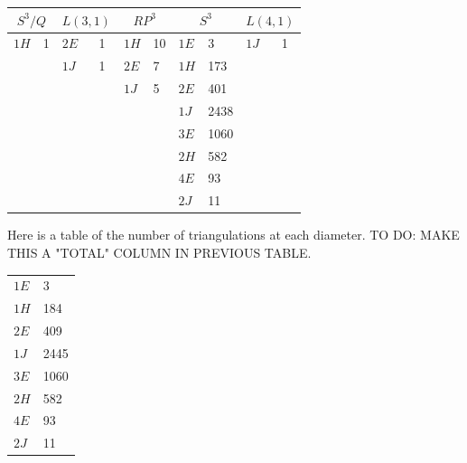 \documentclass[12pt]{article}
\begin{document}
\begin{tabular} {| l l | l l | l l | l l | l l |}
\hline
\multicolumn{2}{|c|}{$S^{3}/Q$} &
\multicolumn{2}{|c|}{$L(3,1)$} &
\multicolumn{2}{|c|}{$RP^{3}$} &
\multicolumn{2}{|c|}{$S^{3}$} &
\multicolumn{2}{|c|}{$L(4,1)$} \\
\hline
\hline
$1H$&1    &$2E$&1    &$1H$&10    &$1E$&3    &$1J$&1 \\
  &       &$1J$&1    &$2E$&7     &$1H$&173  &    &  \\
  &       &  &       &$1J$&5     &$2E$&401  &    &  \\
  &       &  &       &    &      &$1J$&2438 &    &  \\
  &       &  &       &    &      &$3E$&1060 &    &  \\
  &       &  &       &    &      &$2H$&582  &    &  \\
  &       &  &       &    &      &$4E$&93   &    &  \\
  &       &  &       &    &      &$2J$&11   &    &  \\
\hline
\end{tabular}

\noindent Here is a table of the number of triangulations at each diameter. TO DO: MAKE THIS A "TOTAL" COLUMN IN PREVIOUS TABLE.\vspace{.1in}

\begin{tabular} {| l l |}
\hline
$1E$ &       3\\
$1H$ &       184\\
$2E$ &       409\\
$1J$ &       2445\\
$3E$ &       1060\\
$2H$ &       582\\
$4E$ &       93\\
$2J$ &       11\\
\hline
\end{tabular}
\end{document}
